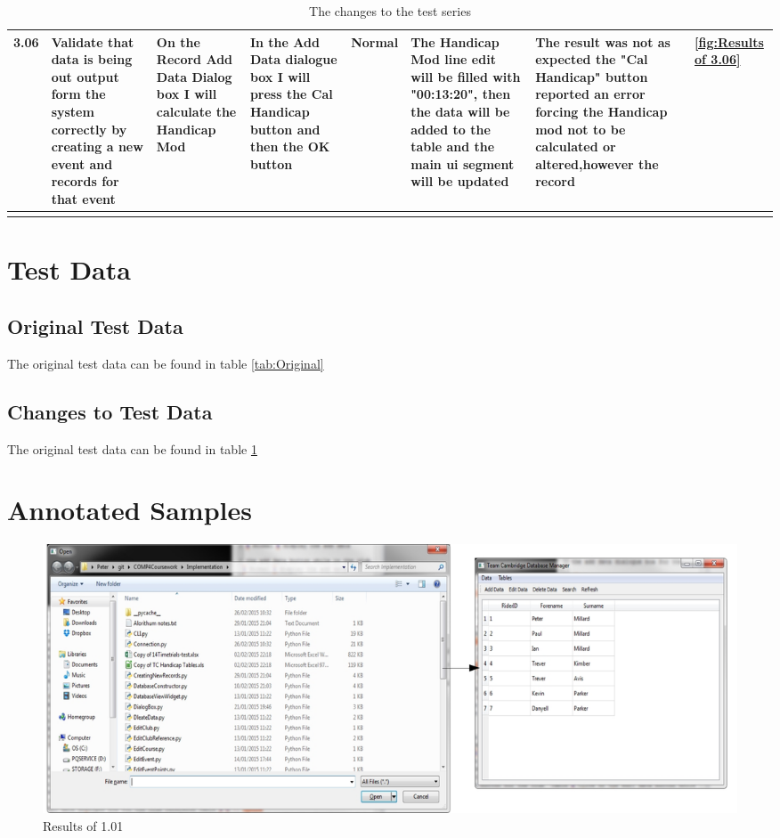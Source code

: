 \begin{landscape}
\begin{center}
\begin{longtable}{|p{1.5cm}|p{2.5cm}|p{2.5cm}|p{2cm}|p{2cm}|p{2cm}|p{2cm}|p{2cm}|}
        \rowcolor{LiteGray} 3.06 & Validate that data is being out output form the system correctly by creating a new event and records for that event & On the Record Add Data Dialog box I will calculate the Handicap Mod & In the Add Data dialogue box I will press the Cal Handicap button and then the OK button & Normal & The Handicap Mod line edit will be filled with "00:13:20", then  the data will be added to the table and the main ui segment will be updated & The result was not as expected the "Cal Handicap" button reported an error forcing the Handicap mod not to be calculated or altered,however the record & \ref{fig:Results of 3.06} \\ \hline
        \caption{The changes to the test series}
        \label{tab:Changes} 
    \end{longtable}
\end{center}


\section{Test Data}

\subsection{Original Test Data}
The original test data can be found in table \ref{tab:Original}

\subsection{Changes to Test Data}
The original test data can be found in table \ref{tab:Changes}

\section{Annotated Samples}
\begin{figure}[H]
    \includegraphics[width=\textwidth]{./Testing/S3/101.pdf}
    \caption{Results of 1.01} \label{fig:Results of 1.01}
\end{figure}


\end{landscape}
